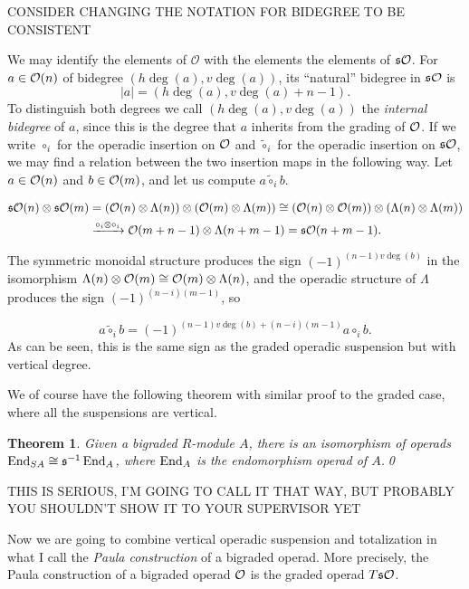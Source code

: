 \documentclass[twoside]{article}
\newtheorem{thm}[defin]{Theorem}
\begin{document}
CONSIDER CHANGING THE NOTATION FOR BIDEGREE TO BE CONSISTENT

We may identify the elements of $\mathcal{O}$ with the elements the elements of $\mathfrak{s}{\mathcal O}$. For $a\in{\mathcal O}(n)$ of bidegree $(h\deg(a),v\deg(a))$, its ``natural'' bidegree in $\mathfrak{s}{\mathcal O}$ is \[|a|=(h\deg(a),v\deg(a)+n-1).\] To distinguish both degrees we call $(h\deg(a),v\deg(a))$ the \emph{internal bidegree} of $a$, since this is the degree that $a$ inherits from the grading of ${\mathcal O}$. If we write $\circ_i$ for the operadic insertion on ${\mathcal O}$ and $\tilde{\circ}_i$ for the operadic insertion on $\mathfrak{s}{\mathcal O}$, we may find a relation between the two insertion maps in the following way. Let $a\in{\mathcal O}(n)$ and $b\in{\mathcal O}(m)$, and let us compute $a\tilde{\circ}_i b$.

\begin{align*}
\mathfrak{s}{\mathcal O}(n)\otimes\mathfrak{s}{\mathcal O}(m)&=({\mathcal O}(n)\otimes\Lambda(n))\otimes ({\mathcal O}(m)\otimes\Lambda(m))\cong ({\mathcal O}(n)\otimes {\mathcal O}(m))\otimes (\Lambda(n)\otimes \Lambda(m))\\
&\xrightarrow{\circ_i\otimes\circ_i} {\mathcal O}(m+n-1)\otimes \Lambda(n+m-1)=\mathfrak{s}{\mathcal O}(n+m-1).
\end{align*}

The symmetric monoidal structure produces the sign $(-1)^{(n-1)v\deg(b)}$ in the isomorphism $\Lambda(n)\otimes {\mathcal O}(m)\cong{\mathcal O}(m)\otimes\Lambda(n)$, and the operadic structure of $\Lambda$ produces the sign $(-1)^{(n-i)(m-1)}$, so 

\begin{equation}\label{sign}
a\tilde{\circ}_ib=(-1)^{(n-1)v\deg(b)+(n-i)(m-1)}a\circ_i b.
\end{equation}
As can be seen, this is the same sign as the graded operadic suspension but with vertical degree.

We of course have the following theorem with similar proof to the graded case, where all the suspensions are vertical.
\begin{thm}\label{markl}
Given a bigraded $R$-module $A$, there is an isomorphism of operads $\operatorname{End}_{S A}\cong \mathfrak{s}^{-1}\operatorname{End}_A$, where $\operatorname{End}_A$ is the endomorphism operad of $A$.\qed
\end{thm}
 
 THIS IS SERIOUS, I'M GOING TO CALL IT THAT WAY, BUT PROBABLY YOU SHOULDN'T SHOW IT TO YOUR SUPERVISOR YET
 
Now we are going to combine vertical operadic suspension and totalization in what I call the \emph{Paula construction} of a bigraded operad. More precisely, the Paula construction of a bigraded operad ${\mathcal O}$ is the graded operad $T\mathfrak{s}{\mathcal O}$. 
\end{document}
